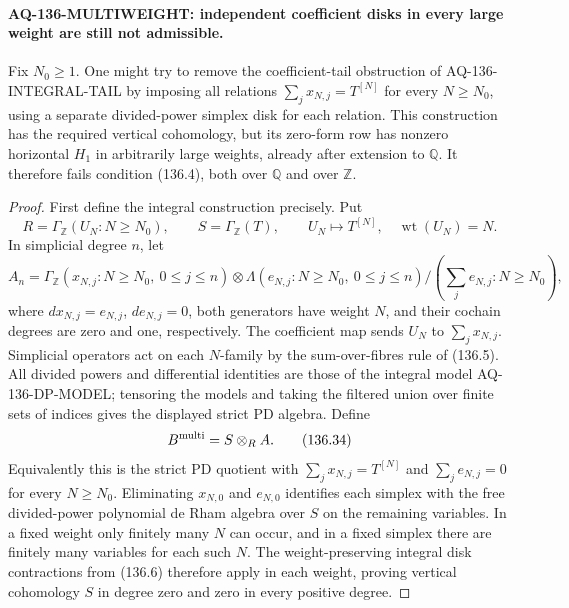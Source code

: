 \documentclass[11pt,a4paper]{article}
\theoremstyle{definition}\newtheorem{definition}[theorem]{Definition}
\theoremstyle{remark}\newtheorem{remark}[theorem]{Remark}
\begin{document}
\paragraph{AQ-136-MULTIWEIGHT: independent coefficient disks in every large weight are still not admissible.}
Fix $N_0\geq1$.  One might try to remove the coefficient-tail
obstruction of AQ-136-INTEGRAL-TAIL by imposing all relations
$\sum_jx_{N,j}=T^{[N]}$ for every $N\geq N_0$, using a
separate divided-power simplex disk for each relation.
This construction has the required vertical cohomology,
but its zero-form row has nonzero horizontal $H_1$ in
arbitrarily large weights, already after extension to
$\mathbb Q$.  It therefore fails condition (136.4), both
over $\mathbb Q$ and over $\mathbb Z$.

\begin{proof}
First define the integral construction precisely.  Put
\[
 R=\Gamma_{\mathbb Z}(U_N:N\geq N_0),\qquad
 S=\Gamma_{\mathbb Z}(T),\qquad
 U_N\longmapsto T^{[N]},\quad \operatorname{wt}(U_N)=N.
                                                               \tag{136.32}
\]
In simplicial degree $n$, let
\[
 A_n=\Gamma_{\mathbb Z}(x_{N,j}:N\geq N_0,\ 0\leq j\leq n)
       \otimes\Lambda(e_{N,j}:N\geq N_0,\ 0\leq j\leq n)
       /(\textstyle\sum_j e_{N,j}:N\geq N_0),                \tag{136.33}
\]
where $d x_{N,j}=e_{N,j}$, $d e_{N,j}=0$, both generators
have weight $N$, and their cochain degrees are zero and
one, respectively.  The coefficient map sends
$U_N$ to $\sum_jx_{N,j}$.  Simplicial operators act on
each $N$-family by the sum-over-fibres rule of (136.5).
All divided powers and differential identities are those
of the integral model AQ-136-DP-MODEL; tensoring the
models and taking the filtered union over finite sets
of indices gives the displayed strict PD algebra.
Define
\[
                         B^{\rm multi}=S\otimes_R A.        \tag{136.34}
\]
Equivalently this is the strict PD quotient with
$\sum_jx_{N,j}=T^{[N]}$ and $\sum_j e_{N,j}=0$ for every
$N\geq N_0$.  Eliminating $x_{N,0}$ and $e_{N,0}$
identifies each simplex with the free divided-power
polynomial de Rham algebra over $S$ on the remaining
variables.  In a fixed weight only finitely many $N$
can occur, and in a fixed simplex there are finitely
many variables for each such $N$.  The weight-preserving
integral disk contractions from (136.6) therefore apply
in each weight, proving vertical cohomology $S$ in
degree zero and zero in every positive degree.


\end{proof}
\end{document}
